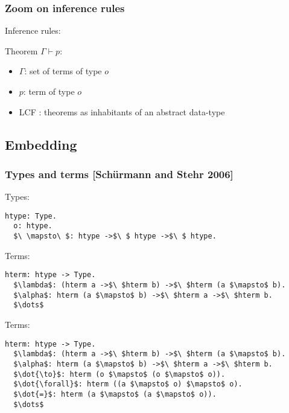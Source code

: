 \begin{frame}
\frametitle{Zoom on inference rules}

Inference rules:
\begin{mathpar}

\end{mathpar}

\vspace{0.5cm}

Theorem $\Gamma \vdash p$:
\begin{itemize}
\item $\Gamma$: set of terms of type $o$
\item $p$: term of type $o$
\end{itemize}

\vspace{0.5cm}

\begin{itemize}
\item LCF : theorems as inhabitants of an abstract data-type
\end{itemize}

\end{frame}


\subsection{Embedding}

\begin{frame}[fragile]
\frametitle{Types and terms [Schürmann and Stehr 2006]}

\begin{block}{Types:}
\begin{lstlisting}
htype: Type.
  o: htype.
  $\ \mapsto\ $: htype ->$\ $ htype ->$\ $ htype.
\end{lstlisting}
\end{block}

\begin{overprint}
\begin{block}{Terms:}
\begin{lstlisting}
hterm: htype -> Type.
  $\lambda$: (hterm a ->$\ $hterm b) ->$\ $hterm (a $\mapsto$ b).
  $\alpha$: hterm (a $\mapsto$ b) ->$\ $hterm a ->$\ $hterm b.
  $\dots$
\end{lstlisting}
\end{block}

\begin{block}{Terms:}
\begin{lstlisting}
hterm: htype -> Type.
  $\lambda$: (hterm a ->$\ $hterm b) ->$\ $hterm (a $\mapsto$ b).
  $\alpha$: hterm (a $\mapsto$ b) ->$\ $hterm a ->$\ $hterm b.
  $\dot{\to}$: hterm (o $\mapsto$ (o $\mapsto$ o)).
  $\dot{\forall}$: hterm ((a $\mapsto$ o) $\mapsto$ o).
  $\dot{=}$: hterm (a $\mapsto$ (a $\mapsto$ o)).
  $\dots$
\end{lstlisting}
\end{block}
\end{overprint}

\end{frame}


